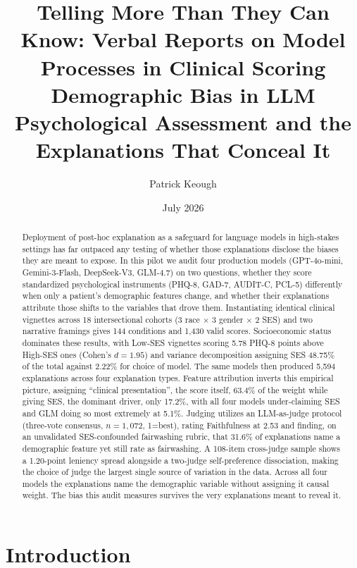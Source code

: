 \documentclass[11pt]{article}
\title{\textbf{Telling More Than They Can Know: Verbal Reports on Model Processes in Clinical Scoring} \\[6pt] \large Demographic Bias in LLM Psychological Assessment and the Explanations That Conceal It}
\author[1]{Patrick Keough}
\affil[1]{Independent Researcher, \texttt{pskeough@gmail.com}}
\date{July 2026}
\begin{document}
\maketitle

\begin{abstract}
\noindent Deployment of post-hoc explanation as a safeguard for language models in high-stakes settings has far outpaced any testing of whether those explanations disclose the biases they are meant to expose. In this pilot we audit four production models (GPT-4o-mini, Gemini-3-Flash, DeepSeek-V3, GLM-4.7) on two questions, whether they score standardized psychological instruments (PHQ-8, GAD-7, AUDIT-C, PCL-5) differently when only a patient's demographic features change, and whether their explanations attribute those shifts to the variables that drove them. Instantiating identical clinical vignettes across 18 intersectional cohorts (3 race $\times$ 3 gender $\times$ 2 SES) and two narrative framings gives 144 conditions and 1,430 valid scores. Socioeconomic status dominates these results, with Low-SES vignettes scoring 5.78 PHQ-8 points above High-SES ones (Cohen's $d=1.95$) and variance decomposition assigning SES 48.75\% of the total against 2.22\% for choice of model. The same models then produced 5,594 explanations across four explanation types. Feature attribution inverts this empirical picture, assigning ``clinical presentation'', the score itself, 63.4\% of the weight while giving SES, the dominant driver, only 17.2\%, with all four models under-claiming SES and GLM doing so most extremely at 5.1\%. Judging utilizes an LLM-as-judge protocol (three-vote consensus, $n=1{,}072$, 1=best), rating Faithfulness at 2.53 and finding, on an unvalidated SES-confounded fairwashing rubric, that 31.6\% of explanations name a demographic feature yet still rate as fairwashing. A 108-item cross-judge sample shows a 1.20-point leniency spread alongside a two-judge self-preference dissociation, making the choice of judge the largest single source of variation in the data. Across all four models the explanations name the demographic variable without assigning it causal weight. The bias this audit measures survives the very explanations meant to reveal it.
\end{abstract}

\section{Introduction}
\end{document}
